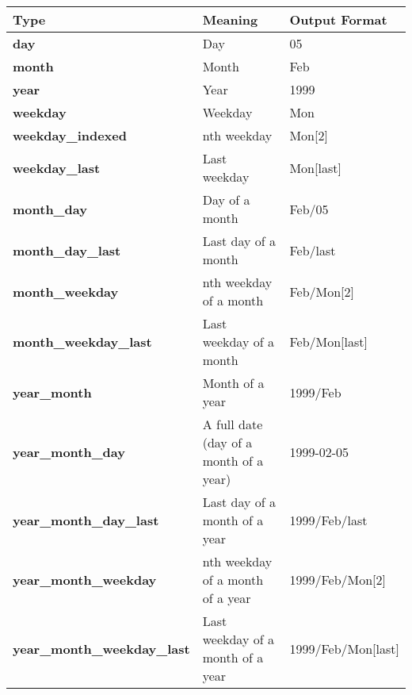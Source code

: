 \begin{longtable}[c]{|l|l|l|}
\hline
\textbf{Type}                   & \textbf{Meaning}                       & \textbf{Output Format} \\ \hline
\endfirsthead
%
\endhead
%
\textbf{day}                    & Day                                    & 05                     \\ \hline
\textbf{month}                  & Month                                  & Feb                    \\ \hline
\textbf{year}                   & Year                                   & 1999                   \\ \hline
\textbf{weekday}                & Weekday                                & Mon                    \\ \hline
\textbf{weekday\_indexed}       & nth weekday                            & Mon{[}2{]}             \\ \hline
\textbf{weekday\_last}          & Last weekday                           & Mon{[}last{]}          \\ \hline
\textbf{month\_day}             & Day of a month                         & Feb/05                 \\ \hline
\textbf{month\_day\_last}       & Last day of a month                    & Feb/last               \\ \hline
\textbf{month\_weekday}         & nth weekday of a month                 & Feb/Mon{[}2{]}         \\ \hline
\textbf{month\_weekday\_last}   & Last weekday of a month                & Feb/Mon{[}last{]}      \\ \hline
\textbf{year\_month}            & Month of a year                        & 1999/Feb               \\ \hline
\textbf{year\_month\_day}       & A full date (day of a month of a year) & 1999-02-05             \\ \hline
\textbf{year\_month\_day\_last} & Last day of a month of a year          & 1999/Feb/last          \\ \hline
\textbf{year\_month\_weekday}       & nth weekday of a month of a year  & 1999/Feb/Mon{[}2{]}    \\ \hline
\textbf{year\_month\_weekday\_last} & Last weekday of a month of a year & 1999/Feb/Mon{[}last{]} \\ \hline
\end{longtable}

